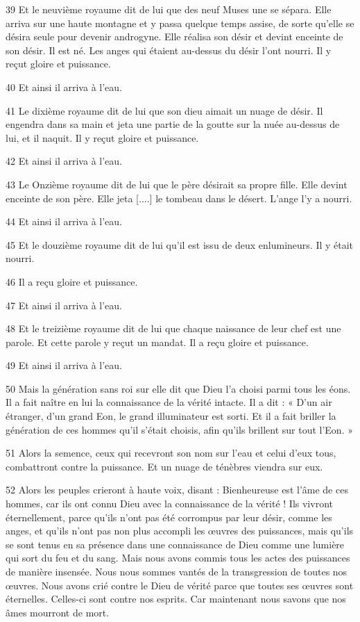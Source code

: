 \par 39 Et le neuvième royaume dit de lui que des neuf Muses une se sépara. Elle arriva sur une haute montagne et y passa quelque temps assise, de sorte qu'elle se désira seule pour devenir androgyne. Elle réalisa son désir et devint enceinte de son désir. Il est né. Les anges qui étaient au-dessus du désir l'ont nourri. Il y reçut gloire et puissance.
\par 40 Et ainsi il arriva à l'eau.
\par 41 Le dixième royaume dit de lui que son dieu aimait un nuage de désir. Il engendra dans sa main et jeta une partie de la goutte sur la nuée au-dessus de lui, et il naquit. Il y reçut gloire et puissance.
\par 42 Et ainsi il arriva à l'eau.
\par 43 Le Onzième royaume dit de lui que le père désirait sa propre fille. Elle devint enceinte de son père. Elle jeta [....] le tombeau dans le désert. L'ange l'y a nourri.
\par 44 Et ainsi il arriva à l'eau.

\par 45 Et le douzième royaume dit de lui qu'il est issu de deux enlumineurs. Il y était nourri.
\par 46 Il a reçu gloire et puissance.
\par 47 Et ainsi il arriva à l'eau.

\par 48 Et le treizième royaume dit de lui que chaque naissance de leur chef est une parole. Et cette parole y reçut un mandat. Il a reçu gloire et puissance.
\par 49 Et ainsi il arriva à l'eau.
\par 50 Mais la génération sans roi sur elle dit que Dieu l'a choisi parmi tous les éons. Il a fait naître en lui la connaissance de la vérité intacte. Il a dit : « D’un air étranger, d’un grand Eon, le grand illuminateur est sorti. Et il a fait briller la génération de ces hommes qu’il s’était choisis, afin qu’ils brillent sur tout l’Eon. »

\par 51 Alors la semence, ceux qui recevront son nom sur l'eau et celui d'eux tous, combattront contre la puissance. Et un nuage de ténèbres viendra sur eux.

\par 52 Alors les peuples crieront à haute voix, disant : Bienheureuse est l'âme de ces hommes, car ils ont connu Dieu avec la connaissance de la vérité ! Ils vivront éternellement, parce qu'ils n'ont pas été corrompus par leur désir, comme les anges, et qu'ils n'ont pas non plus accompli les œuvres des puissances, mais qu'ils se sont tenus en sa présence dans une connaissance de Dieu comme une lumière qui sort du feu et du sang. Mais nous avons commis tous les actes des puissances de manière insensée. Nous nous sommes vantés de la transgression de toutes nos œuvres. Nous avons crié contre le Dieu de vérité parce que toutes ses œuvres sont éternelles. Celles-ci sont contre nos esprits. Car maintenant nous savons que nos âmes mourront de mort.

